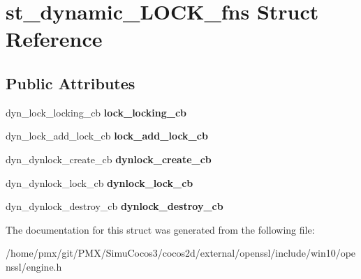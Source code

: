 \hypertarget{structst__dynamic__LOCK__fns}{}\section{st\+\_\+dynamic\+\_\+\+L\+O\+C\+K\+\_\+fns Struct Reference}
\label{structst__dynamic__LOCK__fns}
\subsection*{Public Attributes}
\begin{DoxyCompactItemize}
\item 
\mbox{\label{structst__dynamic__LOCK__fns_a495ddb05b36eee18ce44ed977c6f6d8d}} 
dyn\+\_\+lock\+\_\+locking\+\_\+cb {\bfseries lock\+\_\+locking\+\_\+cb}
\item 
\mbox{\label{structst__dynamic__LOCK__fns_aa7178025f352542e04bb37fd3be59396}} 
dyn\+\_\+lock\+\_\+add\+\_\+lock\+\_\+cb {\bfseries lock\+\_\+add\+\_\+lock\+\_\+cb}
\item 
\mbox{\label{structst__dynamic__LOCK__fns_ad4ec885da11188275dd9e34ef4fe3823}} 
dyn\+\_\+dynlock\+\_\+create\+\_\+cb {\bfseries dynlock\+\_\+create\+\_\+cb}
\item 
\mbox{\label{structst__dynamic__LOCK__fns_a71056a41e6dd1c75eb00ea605bb4945a}} 
dyn\+\_\+dynlock\+\_\+lock\+\_\+cb {\bfseries dynlock\+\_\+lock\+\_\+cb}
\item 
\mbox{\label{structst__dynamic__LOCK__fns_a2a6856844c40ccbb931117bbf775f306}} 
dyn\+\_\+dynlock\+\_\+destroy\+\_\+cb {\bfseries dynlock\+\_\+destroy\+\_\+cb}
\end{DoxyCompactItemize}


The documentation for this struct was generated from the following file\+:\begin{DoxyCompactItemize}
\item 
/home/pmx/git/\+P\+M\+X/\+Simu\+Cocos3/cocos2d/external/openssl/include/win10/openssl/engine.\+h\end{DoxyCompactItemize}
